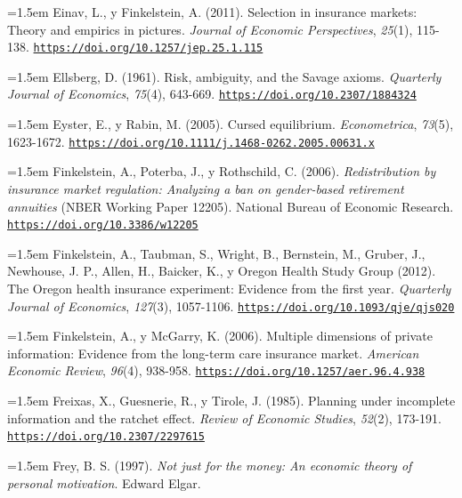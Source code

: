 \documentclass[10pt,a4paper]{article}
\begin{document}
\noindent\hangindent=1.5em Einav, L., y Finkelstein, A. (2011). Selection in insurance markets: Theory and empirics in pictures. \textit{Journal of Economic Perspectives}, \textit{25}(1), 115-138. \href{https://doi.org/10.1257/jep.25.1.115}{\nolinkurl{https://doi.org/10.1257/jep.25.1.115}}

\noindent\hangindent=1.5em Ellsberg, D. (1961). Risk, ambiguity, and the Savage axioms. \textit{Quarterly Journal of Economics}, \textit{75}(4), 643-669. \href{https://doi.org/10.2307/1884324}{\nolinkurl{https://doi.org/10.2307/1884324}}

\noindent\hangindent=1.5em Eyster, E., y Rabin, M. (2005). Cursed equilibrium. \textit{Econometrica}, \textit{73}(5), 1623-1672. \href{https://doi.org/10.1111/j.1468-0262.2005.00631.x}{\nolinkurl{https://doi.org/10.1111/j.1468-0262.2005.00631.x}}

\noindent\hangindent=1.5em Finkelstein, A., Poterba, J., y Rothschild, C. (2006). \textit{Redistribution by insurance market regulation: Analyzing a ban on gender-based retirement annuities} (NBER Working Paper 12205). National Bureau of Economic Research. \href{https://doi.org/10.3386/w12205}{\nolinkurl{https://doi.org/10.3386/w12205}}

\noindent\hangindent=1.5em Finkelstein, A., Taubman, S., Wright, B., Bernstein, M., Gruber, J., Newhouse, J. P., Allen, H., Baicker, K., y Oregon Health Study Group (2012). The Oregon health insurance experiment: Evidence from the first year. \textit{Quarterly Journal of Economics}, \textit{127}(3), 1057-1106. \href{https://doi.org/10.1093/qje/qjs020}{\nolinkurl{https://doi.org/10.1093/qje/qjs020}}

\noindent\hangindent=1.5em Finkelstein, A., y McGarry, K. (2006). Multiple dimensions of private information: Evidence from the long-term care insurance market. \textit{American Economic Review}, \textit{96}(4), 938-958. \href{https://doi.org/10.1257/aer.96.4.938}{\nolinkurl{https://doi.org/10.1257/aer.96.4.938}}

\noindent\hangindent=1.5em Freixas, X., Guesnerie, R., y Tirole, J. (1985). Planning under incomplete information and the ratchet effect. \textit{Review of Economic Studies}, \textit{52}(2), 173-191. \href{https://doi.org/10.2307/2297615}{\nolinkurl{https://doi.org/10.2307/2297615}}

\noindent\hangindent=1.5em Frey, B. S. (1997). \textit{Not just for the money: An economic theory of personal motivation}. Edward Elgar.
\end{document}
